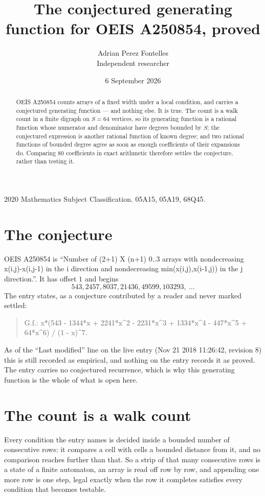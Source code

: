 \documentclass[11pt,a4paper]{article}
\title{The conjectured generating function for OEIS A250854, proved}
\author{Adrian Perez Fontelles\\ \small Independent researcher}
\date{6 September 2026}
\theoremstyle{plain}
\theoremstyle{definition}
\begin{document}
\maketitle

\begin{abstract}
OEIS A250854 counts arrays of a fixed width under a local condition, and carries a conjectured
generating function --- and nothing else. It is true. The count is a walk count in a finite
digraph on $S=64$ vertices, so its generating function is a rational function whose numerator
and denominator have degrees bounded by $S$; the conjectured expression is another rational
function of known degree; and two rational functions of bounded degree agree as soon as enough
coefficients of their expansions do. Comparing $80$ coefficients in exact arithmetic
therefore settles the conjecture, rather than testing it.
\end{abstract}

\noindent\small 2020 Mathematics Subject Classification. 05A15, 05A19, 68Q45.\normalsize

\section{The conjecture}

OEIS A250854 is ``Number of (2+1) X (n+1) 0..3 arrays with nondecreasing x(i,j)-x(i,j-1) in the i direction and nondecreasing min(x(i,j),x(i-1,j)) in the j direction.''. It has offset $1$ and begins
\[
543, 2457, 8037, 21436, 49599, 103293,\ \dots
\]
The entry states, as a conjecture contributed by a reader and never marked settled:
\begin{quote}
G.f.: x*(543 - 1344*x + 2241*x\^{}2 - 2231*x\^{}3 + 1334*x\^{}4 - 447*x\^{}5 + 64*x\^{}6) / (1 - x)\^{}7.
\end{quote}
As of the ``Last modified'' line on the live entry (Nov 21 2018 11:26:42, revision 8) this is still
recorded as empirical, and nothing on the entry records it as proved. The entry carries no
conjectured recurrence, which is why this generating function is the whole of what is open
here.

\section{The count is a walk count}

Every condition the entry names is decided inside a bounded number of consecutive rows: it
compares a cell with cells a bounded distance from it, and no comparison reaches further than
that. So a strip of that many consecutive rows is a state of a finite automaton, an array is
read off row by row, and appending one more row is one step, legal exactly when the row it
completes satisfies every condition that becomes testable.
\end{document}
